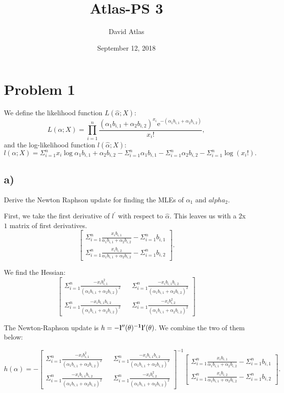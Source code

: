 \documentclass[]{article}
\title{Atlas-PS 3}
\author{David Atlas}
\date{September 12, 2018}
\begin{document}
\maketitle

\newcommand{\summ}{\Sigma_{i=1}^{n}}
\newcommand{\prodd}{\prod_{i=1}^{n}}
\newcommand{\pha}{\alpha_1 b_{i, 1} + \alpha_2 b_{i, 2}}



\section{Problem 1}\label{problem-1}

We define the likelihood function \(L(\hat{\alpha}; X)\): \[
L(\alpha; X) = \prodd \frac{(\pha)^{x_i} \mathrm{e}^{-(\pha)}}{x_i!},
\] and the log-likelihood function \(l(\hat{\alpha}; X)\): \[
l(\alpha; X) = \summ x_i \log{\pha} - \summ{\alpha_1 b_{i, 1}} - 
  \summ{\alpha_2 b_{i,2}} - \summ \log(x_i !).
\]

\subsection{a)}\label{a}

Derive the Newton Raphson update for finding the MLEs of \(\alpha_1\)
and \(alpha_2\).

First, we take the first derivative of \(l^\prime\) with respect to
\(\hat{\alpha}\). This leaves us with a \(2\)x\(1\) matrix of first
derivatives. \[
\begin{bmatrix}
\summ \frac{x_i b_{i, 1}}{\pha} - \summ b_{i, 1} \\
\summ \frac{x_i b_{i, 2}}{\pha} - \summ b_{i, 2}
\end{bmatrix}.
\]

We find the Hessian: \[
\begin{bmatrix}
\summ \frac{-x_i b_{i, 1}^2}{(\pha)^2} && 
\summ \frac{-x_i b_{i, 1}b_{i, 2}}{(\pha)^2} \\
\summ \frac{-x_i b_{i, 1}b_{i, 2}}{(\pha)^2} &&
\summ \frac{-x_i b_{i, 2}^2}{(\pha)^2}
\end{bmatrix}
\]

The Newton-Raphson update is
\(h=-\bf{l}^{\prime\prime}(\bf{\theta})^{-1}\bf{l}^\prime(\bf{\theta})\).
We combine the two of them below:

\[
h(\alpha) = - \begin{bmatrix}
\summ \frac{-x_i b_{i, 1}^2}{(\pha)^2} && 
\summ \frac{-x_i b_{i, 1}b_{i, 2}}{(\pha)^2} \\
\summ \frac{-x_i b_{i, 1}b_{i, 2}}{(\pha)^2} &&
\summ \frac{-x_i b_{i, 2}^2}{(\pha)^2}
\end{bmatrix}^{-1} 
\begin{bmatrix}
\summ \frac{x_i b_{i, 1}}{\pha} - \summ b_{i, 1} \\
\summ \frac{x_i b_{i, 2}}{\pha} - \summ b_{i, 2}
\end{bmatrix}.
\]
\end{document}
